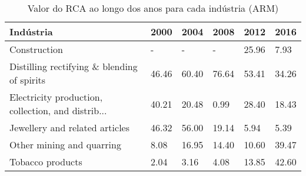 \begin{table}
\centering
\caption{Valor do RCA ao longo dos anos para cada indústria (ARM)}
\begin{tabular}{p{6cm}p{1.5cm}p{1.5cm}p{1.5cm}p{1.5cm}p{1.5cm}}
\toprule
                                         Indústria &  2000 &  2004 &  2008 &  2012 &  2016 \\
\midrule
                                      Construction &     - &     - &     - & 25.96 &  7.93 \\
       Distilling rectifying \& blending of spirits & 46.46 & 60.40 & 76.64 & 53.41 & 34.26 \\
Electricity production, collection, and distrib... & 40.21 & 20.48 &  0.99 & 28.40 & 18.43 \\
                    Jewellery and related articles & 46.32 & 56.00 & 19.14 &  5.94 &  5.39 \\
                         Other mining and quarring &  8.08 & 16.95 & 14.40 & 10.60 & 39.47 \\
                                  Tobacco products &  2.04 &  3.16 &  4.08 & 13.85 & 42.60 \\
\bottomrule
\end{tabular}
\end{table}
